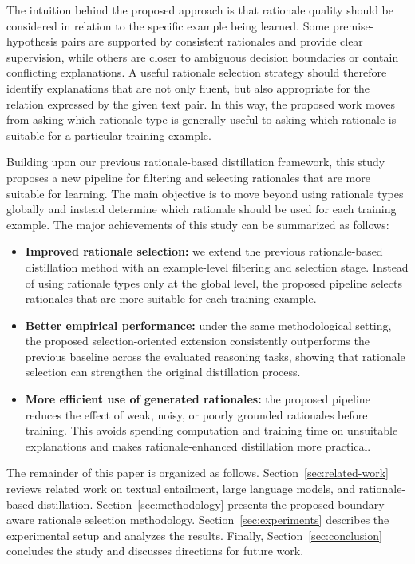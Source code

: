The intuition behind the proposed approach is that rationale quality should be considered in relation to the specific example being learned. Some premise-hypothesis pairs are supported by consistent rationales and provide clear supervision, while others are closer to ambiguous decision boundaries or contain conflicting explanations. A useful rationale selection strategy should therefore identify explanations that are not only fluent, but also appropriate for the relation expressed by the given text pair. In this way, the proposed work moves from asking which rationale type is generally useful to asking which rationale is suitable for a particular training example.

Building upon our previous rationale-based distillation framework, this study proposes a new pipeline for filtering and selecting rationales that are more suitable for learning. The main objective is to move beyond using rationale types globally and instead determine which rationale should be used for each training example. The major achievements of this study can be summarized as follows:

\begin{itemize}
    \item \textbf{Improved rationale selection:} we extend the previous rationale-based distillation method with an example-level filtering and selection stage. Instead of using rationale types only at the global level, the proposed pipeline selects rationales that are more suitable for each training example.
    \item \textbf{Better empirical performance:} under the same methodological setting, the proposed selection-oriented extension consistently outperforms the previous baseline across the evaluated reasoning tasks, showing that rationale selection can strengthen the original distillation process.
    \item \textbf{More efficient use of generated rationales:} the proposed pipeline reduces the effect of weak, noisy, or poorly grounded rationales before training. This avoids spending computation and training time on unsuitable explanations and makes rationale-enhanced distillation more practical.
\end{itemize}

The remainder of this paper is organized as follows. Section~\ref{sec:related-work} reviews related work on textual entailment, large language models, and rationale-based distillation. Section~\ref{sec:methodology} presents the proposed boundary-aware rationale selection methodology. Section~\ref{sec:experiments} describes the experimental setup and analyzes the results. Finally, Section~\ref{sec:conclusion} concludes the study and discusses directions for future work.


